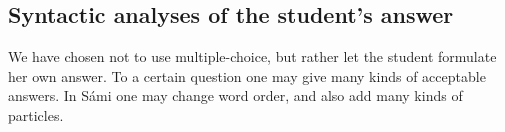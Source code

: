 \documentclass[11pt]{article}
\begin{document}
%

\subsection{Syntactic analyses of the student's answer} \label{sentencefeedback}
We have chosen not to use multiple-choice, but rather let the student formulate her own answer. To a certain question one may give many kinds of acceptable answers. In Sámi one may change word order, and also add many kinds of particles. 
\end{document}
